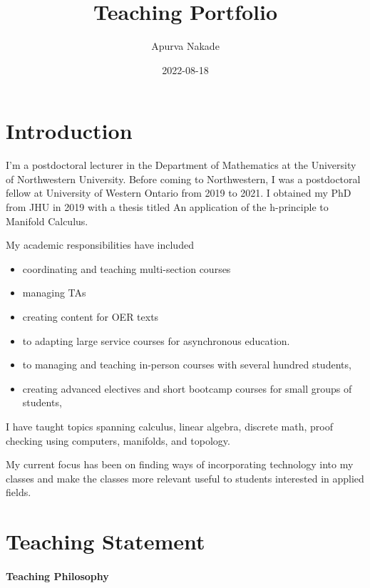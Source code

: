 \documentclass[
]{report}
\title{Teaching Portfolio}
\author{Apurva Nakade}
\date{2022-08-18}
\providecommand{\tightlist}{%
  \setlength{\itemsep}{0pt}\setlength{\parskip}{0pt}}
\begin{document}
\maketitle

\thispagestyle{empty}

{
\setcounter{tocdepth}{2}
\tableofcontents
}
\hypertarget{introduction}{%
\chapter*{Introduction}\label{introduction}}


I'm a postdoctoral lecturer in the Department of Mathematics at the University of Northwestern
University. Before coming to Northwestern, I was a postdoctoral fellow at University of Western
Ontario from 2019 to 2021. I obtained my PhD from JHU in 2019 with a thesis titled An application of
the h-principle to Manifold Calculus.

My academic responsibilities have included

\begin{itemize}
\tightlist
\item
  coordinating and teaching multi-section courses
\item
  managing TAs
\item
  creating content for OER texts\\
\item
  to adapting large service courses for asynchronous education.\\
\item
  to managing and teaching in-person courses with several hundred students,
\item
  creating advanced electives and short bootcamp courses for small groups of students,
\end{itemize}

I have taught topics spanning calculus, linear algebra, discrete math, proof checking using computers, manifolds, and topology.

My current focus has been on finding ways of incorporating technology into my classes and make the
classes more relevant useful to students interested in applied fields.

\hypertarget{teaching-statement}{%
\chapter{Teaching Statement}\label{teaching-statement}}

\hypertarget{teaching-philosophy}{%
\subsubsection*{Teaching Philosophy}\label{teaching-philosophy}}
\end{document}
